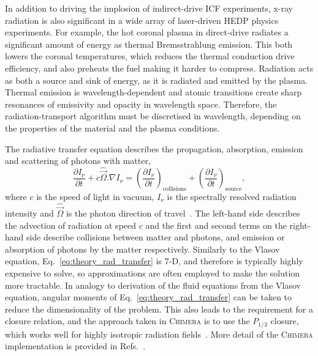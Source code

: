 In addition to driving the implosion of indirect-drive \ac{ICF} experiments, x-ray radiation is also significant in a wide array of laser-driven \ac{HEDP} physics experiments.
For example, the hot coronal plasma in direct-drive radiates a significant amount of energy as thermal Bremsstrahlung emission.
This both lowers the coronal temperatures, which reduces the thermal conduction drive efficiency, and also preheats the fuel making it harder to compress.
Radiation acts as both a source and sink of energy, as it is radiated and emitted by the plasma.
Thermal emission is wavelength-dependent and atomic transitions create sharp resonances of emissivity and opacity in wavelength space.
Therefore, the radiation-transport algorithm must be discretised in wavelength, depending on the properties of the material and the plasma conditions.

The radiative transfer equation describes the propagation, absorption, emission and scattering of photons with matter,
\begin{equation}
    \label{eq:theory_rad_transfer}
    \frac{\partial I_\nu}{\partial t} + c \hat{\vec{\Omega}}.\nabla I_\nu = \left ( \frac{\partial I_\nu}{\partial t} \right )_{\text{collisions}} + \left ( \frac{\partial I_\nu}{\partial t} \right )_{\text{source}},
\end{equation}
where $c$ is the speed of light in vacuum, $I_\nu$ is the spectrally resolved radiation intensity and $\hat{\vec{\Omega}}$ is the photon direction of travel~\cite{castor_radiation_2004}.
The left-hand side describes the advection of radiation at speed $c$ and the first and second terms on the right-hand side describe collisions between matter and photons, and emission or absorption of photons by the matter respectively.
Similarly to the Vlasov equation, Eq.~\ref{eq:theory_rad_transfer} is 7-D, and therefore is typically highly expensive to solve, so approximations are often employed to make the solution more tractable.
In analogy to derivation of the fluid equations from the Vlasov equation, angular moments of Eq.~\ref{eq:theory_rad_transfer} can be taken to reduce the dimensionality of the problem.
This also leads to the requirement for a closure relation, and the approach taken in \textsc{Chimera} is to use the $P_{1/3}$ closure, which works well for highly isotropic radiation fields~\cite{morel_diffusionlimit_2000}.
More detail of the \textsc{Chimera} implementation is provided in Refs.~\cite{jennings_radiation_2005,mcglinchey_radiationhydrodynamics_2017}.

